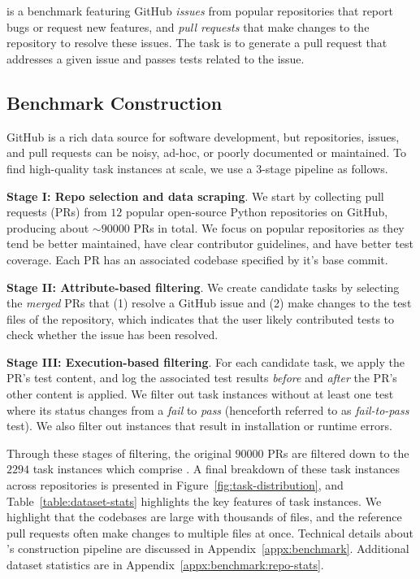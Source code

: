 \section{\benchmark{}}
\label{sec:benchmark}
\benchmark{} is a benchmark featuring GitHub \textit{issues} from popular repositories that report bugs or request new features, and \textit{pull requests} that make changes to the repository to resolve these issues. 
The task is to generate a pull request that addresses a given issue and passes tests related to the issue.

\subsection{Benchmark Construction} 
\label{sec:benchmark:construction}
GitHub is a rich data source for software development, but repositories, issues, and pull requests can be noisy, ad-hoc, or poorly documented or maintained. 
To find high-quality task instances at scale, we use a $3$-stage pipeline as follows.



\textbf{Stage I: Repo selection and data scraping}.
We start by collecting pull requests (PRs) from $12$ popular open-source Python repositories on GitHub, producing about $\sim\num{90000}$ PRs in total.
We focus on popular repositories as they tend be better maintained, have clear contributor guidelines, and have better test coverage.
Each PR has an associated codebase specified by it's base commit.

\textbf{Stage II: Attribute-based filtering}.
We create candidate tasks by selecting the \textit{merged} PRs that (1) resolve a GitHub issue and (2) make changes to the test files of the repository, which indicates that the user likely contributed tests to check whether the issue has been resolved.

\textbf{Stage III: Execution-based filtering}.
For each candidate task, we apply the PR's test content, and log the associated test results \textit{before} and \textit{after} the PR's other content is applied.
We filter out task instances without at least one test where its status changes from a \textit{fail} to \textit{pass} (henceforth referred to as \textit{fail-to-pass} test).
We also filter out instances that result in installation or runtime errors.

Through these stages of filtering, the original $\num{90000}$ PRs are filtered down to the $\num{2294}$ task instances which comprise \benchmark{}.
A final breakdown of these task instances across repositories is presented in Figure~\ref{fig:task-distribution}, and Table~\ref{table:dataset-stats} highlights the key features of \benchmark{} task instances. 
We highlight that the codebases are large with thousands of files, and the reference pull requests often make changes to multiple files at once.
Technical details about \benchmark{}'s construction pipeline are discussed in Appendix~\ref{appx:benchmark}.
Additional dataset statistics are in Appendix~\ref{appx:benchmark:repo-stats}.

